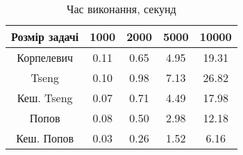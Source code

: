 \begin{table}[H]
	\centering
	\begin{tabular}{|c||c|c|c|c|}\hline
		Розмір задачі & 1000 & 2000 & 5000 & 10000 \\ \hline \hline
		Корпелевич & 0.11 & 0.65 & 4.95 & 19.31 \\ \hline
		Tseng & 0.10 & 0.98 & 7.13 & 26.82 \\ \hline
		Кеш. Tseng & 0.07 & 0.71 & 4.49 & 17.98 \\ \hline
		Попов & 0.08 & 0.50 & 2.98 & 12.18 \\ \hline
		Кеш. Попов & 0.03 & 0.26 & 1.52 & 6.16 \\ \hline
	\end{tabular}
	\caption{Час виконання, секунд}
\end{table}

